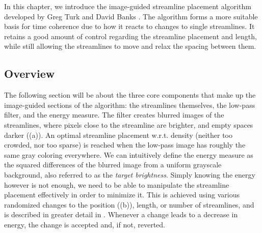 In this chapter, we introduce the image-guided streamline placement
algorithm developed by Greg Turk and David Banks \cite{TurkBanks}.
The algorithm forms a more suitable basis for time coherence due to how it reacts to changes to single streamlines.
It retains a good amount of control regarding the streamline placement and length,
while still allowing the streamlines to move and relax the spacing between them.

\subsection{Overview}
The following section will be about the three core components that make up the image-guided
sections of the algorithm: the streamlines themselves, the low-pass filter, and the energy measure.
The filter creates blurred images of the streamlines,
where pixels close to the streamline are brighter, and empty spaces darker ((a)).
An optimal streamline placement w.r.t. density (neither too crowded, nor too sparse)
is reached when the low-pass image has roughly the same gray coloring everywhere.
We can intuitively define the energy measure as the squared differences of the blurred image from
a uniform grayscale background, also referred to as the \textit{target brightness}.
Simply knowing the energy however is not enough, we need to be able to manipulate
the streamline placement effectively in order to minimize it.
This is achieved using various randomized changes to the position ((b)), length,
or number of streamlines, and is described in greater detail in .
Whenever a change leads to a decrease in energy, the change is accepted and, if not, reverted.

